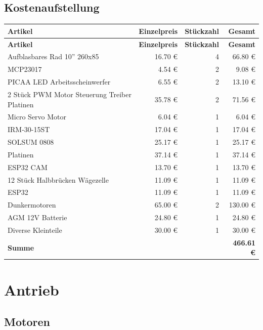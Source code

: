 \documentclass[ngerman,12pt,a4paper]{article}
\begin{document}
		\subsection{Kostenaufstellung} %
			\begin{center}
				\begin{longtable}{| p{8.2cm} | r | r | r |}
					\hline
					\textbf{Artikel} & \textbf{Einzelpreis} & \textbf{Stückzahl} & \textbf{Gesamt} \\
					\hline
					\endfirsthead
					\hline
					\textbf{Artikel} & \textbf{Einzelpreis} & \textbf{Stückzahl} & \textbf{Gesamt} \\
					\hline
					\endhead
					\hline
					Aufblasbares Rad 10'' 260x85  & 16.70 € & 4 & 66.80 € \\ \hline
					MCP23017 & 4.54 € & 2 & 9.08 € \\ \hline
					PICAA LED Arbeitsscheinwerfer & 6.55 € & 2 & 13.10 € \\ \hline
					2 Stück PWM Motor Steuerung Treiber Platinen & 35.78 € & 2 & 71.56 € \\ \hline
					Micro Servo Motor & 6.04 € & 1 & 6.04 € \\ \hline
					IRM-30-15ST & 17.04 € & 1 & 17.04 € \\ \hline
					SOLSUM 0808 & 25.17 € & 1 & 25.17 € \\ \hline
					Platinen & 37.14 € & 1 & 37.14 € \\ \hline
					ESP32 CAM & 13.70 € & 1 & 13.70 € \\ \hline
					12 Stück Halbbrücken Wägezelle & 11.09 € & 1 & 11.09 € \\ \hline
					ESP32 & 11.09 € & 1 & 11.09 € \\ \hline
					Dunkermotoren & 65.00 € & 2 & 130.00 € \\ \hline
					AGM 12V Batterie & 24.80 € & 1 & 24.80 € \\ \hline
					Diverse Kleinteile & 30.00 € & 1 & 30.00 € \\ \hline
					\textbf{Summe} & & & \textbf{466.61 €} \\
					\hline
				\end{longtable}
			\end{center}
			\newpage
	\section{Antrieb}
	
		\subsection{Motoren} %
		
\end{document}
